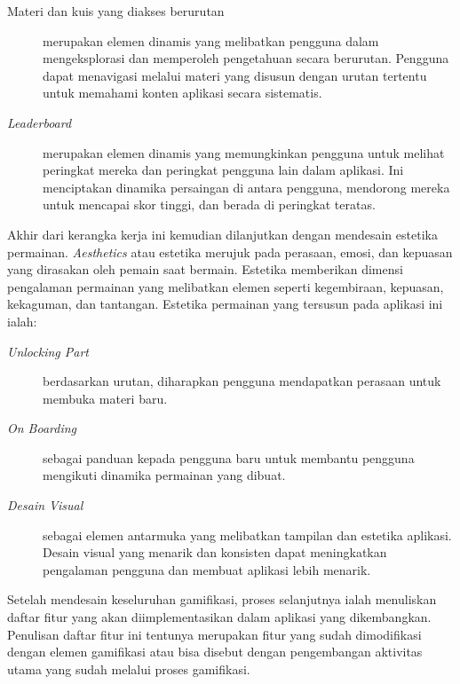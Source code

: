 \begin{description}
	\item[{Materi dan kuis yang diakses berurutan}] merupakan elemen dinamis yang melibatkan pengguna dalam mengeksplorasi dan memperoleh pengetahuan secara berurutan. Pengguna dapat menavigasi melalui materi yang disusun dengan urutan tertentu untuk memahami konten aplikasi secara sistematis.
	\item[\textit{Leaderboard}] merupakan elemen dinamis yang memungkinkan pengguna untuk melihat peringkat mereka dan peringkat pengguna lain dalam aplikasi. Ini menciptakan dinamika persaingan di antara pengguna, mendorong mereka untuk mencapai skor tinggi, dan berada di peringkat teratas.
\end{description}
Akhir dari kerangka kerja ini kemudian dilanjutkan dengan mendesain estetika permainan. \textit{Aesthetics} atau estetika merujuk pada perasaan, emosi, dan kepuasan yang dirasakan oleh pemain saat bermain. Estetika memberikan dimensi pengalaman permainan yang melibatkan elemen seperti kegembiraan, kepuasan, kekaguman, dan tantangan. Estetika permainan yang tersusun pada aplikasi ini ialah: 
\begin{description}
	\item [\textit{Unlocking Part}] berdasarkan urutan, diharapkan pengguna mendapatkan perasaan untuk membuka materi baru.
	\item [\textit{On Boarding}] sebagai panduan kepada pengguna baru untuk membantu pengguna mengikuti dinamika permainan yang dibuat.
	\item [\textit{Desain Visual}] sebagai elemen antarmuka yang melibatkan tampilan dan estetika aplikasi. Desain visual yang menarik dan konsisten dapat meningkatkan pengalaman pengguna dan membuat aplikasi lebih menarik.
\end{description}
Setelah mendesain keseluruhan gamifikasi, proses selanjutnya ialah menuliskan daftar fitur yang akan diimplementasikan dalam aplikasi yang dikembangkan.
Penulisan daftar fitur ini tentunya merupakan fitur yang sudah dimodifikasi dengan elemen gamifikasi 
atau bisa disebut dengan pengembangan aktivitas utama yang sudah melalui proses gamifikasi.
